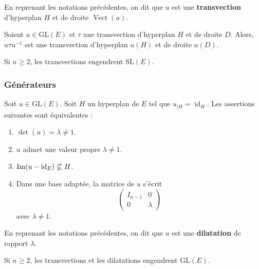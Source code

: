   \begin{definition}
    En reprenant les notations précédentes, on dit que $u$ est une \textbf{transvection} d'hyperplan $H$ et de droite $\operatorname{Vect}(a)$.
  \end{definition}

  \begin{proposition}
    Soient $u \in \mathrm{GL}(E)$ et $\tau$ une transvection d'hyperplan $H$ et de droite $D$. Alors, $u \tau u^{-1}$ est une transvection d'hyperplan $u(H)$ et de droite $u(D)$.
  \end{proposition}

  \begin{theorem}
    Si $n \geq 2$, les transvections engendrent $\mathrm{SL}(E)$.
  \end{theorem}

  \subsubsection{Générateurs}

  \begin{proposition}
    Soit $u \in \mathrm{GL}(E)$. Soit $H$ un hyperplan de $E$ tel que $u_{|H} = \operatorname{id}_H$. Les assertions suivantes sont équivalentes :
    \begin{enumerate}[label=(\roman*)]
      \item $\det(u) = \lambda \neq 1$.
      \item $u$ admet une valeur propre $\lambda \neq 1$.
      \item $\mathrm{Im}(u - \operatorname{id}_E) \not\subseteq H$.
      \item Dans une base adaptée, la matrice de $u$ s'écrit
      \[
        \begin{pmatrix}
          I_{n-1} & 0 \\
          0 & \lambda
        \end{pmatrix}
      \]
      avec $\lambda \neq 1$.
    \end{enumerate}
  \end{proposition}

  \begin{definition}
    En reprenant les notations précédentes, on dit que $u$ est une \textbf{dilatation} de rapport $\lambda$.
  \end{definition}

  \begin{theorem}
    Si $n \geq 2$, les transvections et les dilatations engendrent $\mathrm{GL}(E)$.
  \end{theorem}

